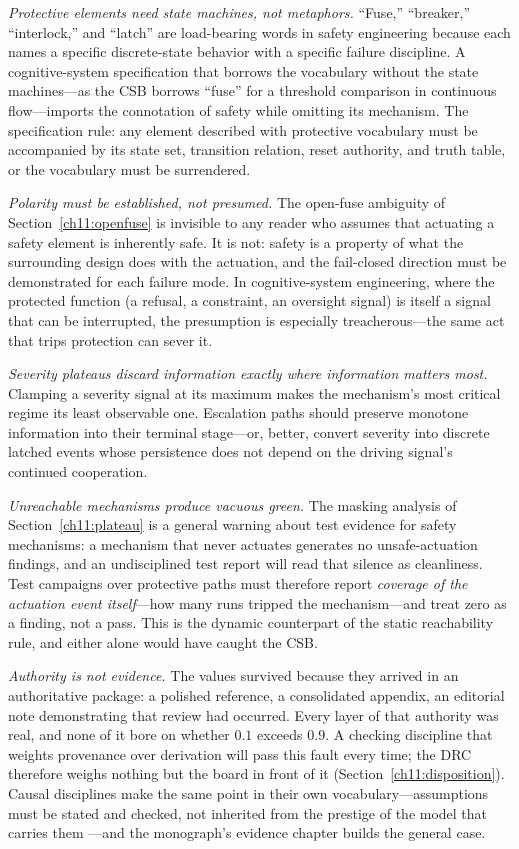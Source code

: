 \emph{Protective elements need state machines, not metaphors.} ``Fuse,'' ``breaker,'' ``interlock,'' and ``latch'' are load-bearing words in safety engineering because each names a specific discrete-state behavior with a specific failure discipline. A cognitive-system specification that borrows the vocabulary without the state machines---as the CSB borrows ``fuse'' for a threshold comparison in continuous flow---imports the connotation of safety while omitting its mechanism. The specification rule: any element described with protective vocabulary must be accompanied by its state set, transition relation, reset authority, and truth table, or the vocabulary must be surrendered.

\emph{Polarity must be established, not presumed.} The open-fuse ambiguity of Section~\ref{ch11:openfuse} is invisible to any reader who assumes that actuating a safety element is inherently safe. It is not: safety is a property of what the surrounding design does with the actuation, and the fail-closed direction must be demonstrated for each failure mode. In cognitive-system engineering, where the protected function (a refusal, a constraint, an oversight signal) is itself a signal that can be interrupted, the presumption is especially treacherous---the same act that trips protection can sever it.

\emph{Severity plateaus discard information exactly where information matters most.} Clamping a severity signal at its maximum makes the mechanism's most critical regime its least observable one. Escalation paths should preserve monotone information into their terminal stage---or, better, convert severity into discrete latched events whose persistence does not depend on the driving signal's continued cooperation.

\emph{Unreachable mechanisms produce vacuous green.} The masking analysis of Section~\ref{ch11:plateau} is a general warning about test evidence for safety mechanisms: a mechanism that never actuates generates no unsafe-actuation findings, and an undisciplined test report will read that silence as cleanliness. Test campaigns over protective paths must therefore report \emph{coverage of the actuation event itself}---how many runs tripped the mechanism---and treat zero as a finding, not a pass. This is the dynamic counterpart of the static reachability rule, and either alone would have caught the CSB.

\emph{Authority is not evidence.} The values survived because they arrived in an authoritative package: a polished reference, a consolidated appendix, an editorial note demonstrating that review had occurred. Every layer of that authority was real, and none of it bore on whether $0.1$ exceeds $0.9$. A checking discipline that weights provenance over derivation will pass this fault every time; the DRC therefore weighs nothing but the board in front of it (Section~\ref{ch11:disposition}). Causal disciplines make the same point in their own vocabulary---assumptions must be stated and checked, not inherited from the prestige of the model that carries them \cite{pearl}---and the monograph's evidence chapter builds the general case.

